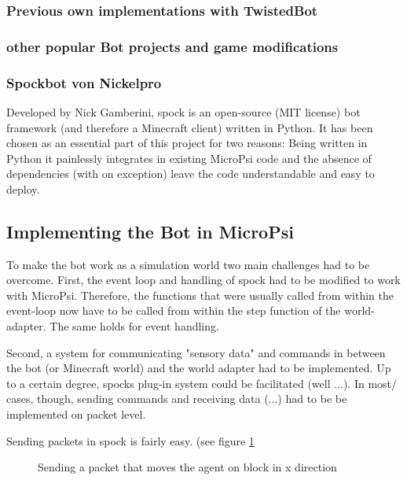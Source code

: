 \subsubsection{Previous own implementations with TwistedBot}

\subsubsection{other popular Bot projects and game modifications}

\subsubsection{Spockbot von Nickelpro}
Developed by Nick Gamberini, spock is an open-source (MIT license) bot framework (and therefore a Minecraft client) written in Python. It has been chosen as an essential part of this project for two reasons: Being written in Python it painlessly integrates in existing MicroPsi code and the absence of dependencies (with on exception) leave the code understandable and easy to deploy.

\subsection{Implementing the Bot in MicroPsi}
To make the bot work as a simulation world two main challenges had to be overcome. First, the event loop and handling of spock had to be modified to work with MicroPsi. Therefore, the functions that were usually called from within the event-loop now have to be called from within the step function of the world-adapter. The same holds for event handling. 

Second, a system for communicating "sensory data" and commands in between the bot (or Minecraft world) and the world adapter had to be implemented. Up to a certain degree, spocks plug-in system could be facilitated (well ...). In most/ cases, though, sending commands and receiving data (...) had to be be implemented on packet level.

Sending packets in spock is fairly easy. (see figure \ref{snippet_position-packet}

\begin{figure}[ht]
			\centering
			\begin{minipage}{11cm}
				\begin{pseudocode}
					'x': (client.position['x'] + 1)  / 1,
    					'y': client.position['y'] / 1,
					'z': client.position['z'] / 1,
					'on_ground': False,
					'stance': client.position['y'] + 0.11
					}))
				\end{pseudocode}
				\caption{Sending a packet that moves the agent on block in x direction}
				\label{snippet_position-packet}
			\end{minipage}
		\end{figure}
		

